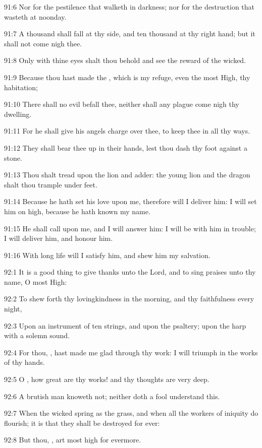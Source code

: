 91:6 Nor for the pestilence that walketh in darkness; nor for the
destruction that wasteth at noonday.

91:7 A thousand shall fall at thy side, and ten thousand at thy right
hand; but it shall not come nigh thee.

91:8 Only with thine eyes shalt thou behold and see the reward of the
wicked.

91:9 Because thou hast made the \LORD, which is my refuge, even the
most High, thy habitation;

91:10 There shall no evil befall thee, neither shall any plague come
nigh thy dwelling.

91:11 For he shall give his angels charge over thee, to keep thee in
all thy ways.

91:12 They shall bear thee up in their hands, lest thou dash thy foot
against a stone.

91:13 Thou shalt tread upon the lion and adder: the young lion and the
dragon shalt thou trample under feet.

91:14 Because he hath set his love upon me, therefore will I deliver
him: I will set him on high, because he hath known my name.

91:15 He shall call upon me, and I will answer him: I will be with him
in trouble; I will deliver him, and honour him.

91:16 With long life will I satisfy him, and shew him my salvation.



92:1 It is a good thing to give thanks unto the Lord, and to sing
praises unto thy name, O most High:

92:2 To shew forth thy lovingkindness in the morning, and thy
faithfulness every night,

92:3 Upon an instrument of ten strings, and upon the psaltery; upon
the harp with a solemn sound.

92:4 For thou, \LORD, hast made me glad through thy work: I will
triumph in the works of thy hands.

92:5 O \LORD, how great are thy works! and thy thoughts are very deep.

92:6 A brutish man knoweth not; neither doth a fool understand this.

92:7 When the wicked spring as the grass, and when all the workers of
iniquity do flourish; it is that they shall be destroyed for ever:

92:8 But thou, \LORD, art most high for evermore.

